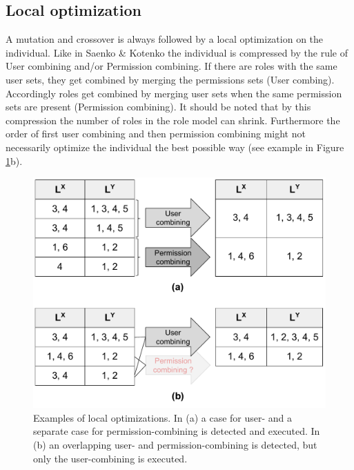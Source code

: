         \subsection{Local optimization}
        \label{sec:localOptimization}
        A mutation and crossover is always followed by a local optimization on the individual. Like in Saenko \& Kotenko\cite{saenko2012design} the individual is compressed by the rule of User combining and/or Permission combining. If there are roles with the same user sets, they get combined by merging the permissions sets (User combing). Accordingly roles get combined by merging user sets when the same permission sets are present (Permission combining). It should be noted that by this compression the number of roles in the role model can shrink. Furthermore the order of first user combining and then permission combining might not necessarily optimize the individual the best possible way (see example in Figure \ref{fig:localOptimization}b).
        \begin{figure}
            \centering
            \includegraphics[scale=0.27]{./Figures/LocalOptimization}
            \caption{Examples of local optimizations. In (a) a case for user- and a separate case for permission-combining is detected and executed. In (b) an overlapping user- and permission-combining is detected, but only the user-combining is executed.}
            \label{fig:localOptimization}
        \end{figure}
        
